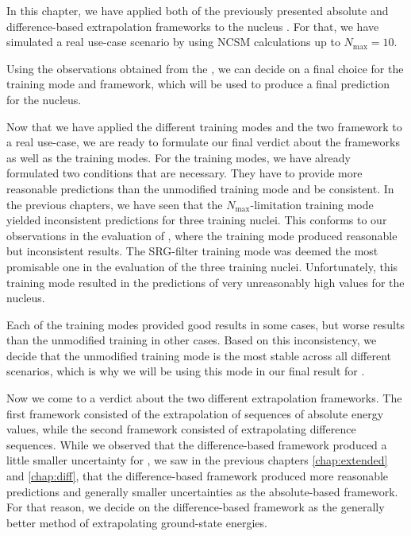 In this chapter, we have applied both of the previously presented absolute and difference-based extrapolation frameworks to the nucleus . For that, we have simulated a real use-case scenario by using NCSM calculations up to $N_\mathrm{max} = 10$.

Using the observations obtained from the , we can decide on a final choice for the training mode and framework, which will be used to produce a final prediction for the  nucleus.

Now that we have applied the different training modes and the two framework to a real use-case, we are ready to formulate our final verdict about the frameworks as well as the training modes. For the training modes, we have already formulated two conditions that are necessary. They have to provide more reasonable predictions than the unmodified training mode and be consistent. In the previous chapters, we have seen that the $N_\mathrm{max}$-limitation training mode yielded inconsistent predictions for three training nuclei. This conforms to our observations in the evaluation of , where the training mode produced reasonable but inconsistent results. The SRG-filter training mode was deemed the most promisable one in the evaluation of the three training nuclei. Unfortunately, this training mode resulted in the predictions of very unreasonably high values for the  nucleus.

Each of the training modes provided good results in some cases, but worse results than the unmodified training in other cases. Based on this inconsistency, we decide that the unmodified training mode is the most stable across all different scenarios, which is why we will be using this mode in our final result for .

Now we come to a verdict about the two different extrapolation frameworks. The first framework consisted of the extrapolation of sequences of absolute energy values, while the second framework consisted of extrapolating difference sequences. While we observed that the difference-based framework produced a little smaller uncertainty for , we saw in the previous chapters \ref{chap:extended} and \ref{chap:diff}, that the difference-based framework produced more reasonable predictions and generally smaller uncertainties as the absolute-based framework. For that reason, we decide on the difference-based framework as the generally better method of extrapolating ground-state energies.

